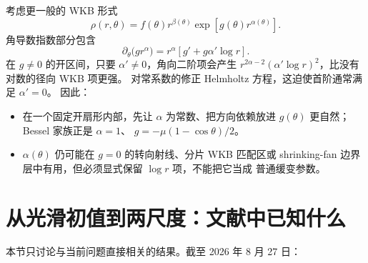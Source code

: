\documentclass[11pt,a4paper,fontset=fandol]{ctexart}
\begin{document}
考虑更一般的 WKB 形式
\begin{equation}
  \rho(r,\theta)=f(\theta)r^{\beta(\theta)}
  \exp\!\left[g(\theta)r^{\alpha(\theta)}\right].
  \label{eq:angle-dependent-alpha}
\end{equation}
角导数指数部分包含
\begin{equation}
  \partial_\theta\bigl(g r^\alpha\bigr)
  =r^\alpha\left[g'+g\alpha'\log r\right].
\end{equation}
在 $g\ne0$ 的开区间，只要 $\alpha'\ne0$，角向二阶项会产生
$r^{2\alpha-2}(\alpha'\log r)^2$，比没有对数的径向 WKB 项更强。
对常系数的修正 Helmholtz 方程，这迫使首阶通常满足 $\alpha'=0$。
因此：
\begin{itemize}
  \item 在一个固定开扇形内部，先让 $\alpha$ 为常数、把方向依赖放进
  $g(\theta)$ 更自然；Bessel 家族正是 $\alpha=1$、
  $g=-\mu(1-\cos\theta)/2$。
  \item $\alpha(\theta)$ 仍可能在 $g=0$ 的转向射线、分片 WKB 匹配区或
  shrinking-fan 边界层中有用，但必须显式保留 $\log r$ 项，不能把它当成
  普通缓变参数。
\end{itemize}

\section{从光滑初值到两尺度：文献中已知什么}

本节只讨论与当前问题直接相关的结果。截至 2026 年 8 月 27 日：
\end{document}
